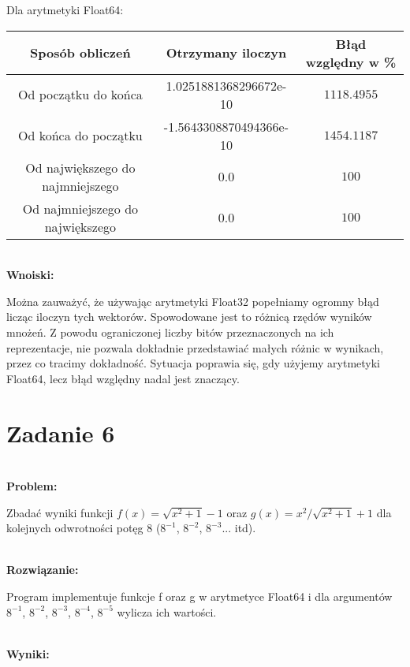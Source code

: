 \documentclass[a4paper,12pt]{article}
\begin{document}
Dla arytmetyki Float64:

\begin{center}
\begin{tabular}{ |c|c|c| }
\hline
Sposób obliczeń & Otrzymany iloczyn & Błąd względny w \% \\
\hline
Od początku do końca & \small{1.0251881368296672e-10} & \small{\(1118.4955\)} \\
Od końca do początku & \small{-1.5643308870494366e-10} & \small{\(1454.1187\)} \\
Od największego do najmniejszego & \small{0.0} & \small{\(100\)} \\
Od najmniejszego do największego & \small{0.0} & \small{\(100\)} \\
\hline
\end{tabular}
\end{center}

\textbf{\\Wnoiski:}

Można zauważyć, że używając arytmetyki Float32 popełniamy ogromny błąd licząc iloczyn tych wektorów. Spowodowane jest to różnicą rzędów wyników mnożeń. Z powodu ograniczonej liczby bitów przeznaczonych na ich reprezentacje, nie pozwala dokładnie przedstawiać małych różnic w wynikach, przez co tracimy dokładność. Sytuacja poprawia się, gdy użyjemy arytmetyki Float64, lecz błąd względny nadal jest znaczący.

\section{Zadanie 6}

\textbf{\\Problem:}

Zbadać wyniki funkcji \(f(x)=\sqrt{x^2+1}-1\) oraz \(g(x)=x^2/\sqrt{x^2+1}+1\) dla kolejnych odwrotności potęg 8 (\(8^{-1}\), \(8^{-2}\), \(8^{-3}\)... itd).

\textbf{\\Rozwiązanie:}

Program implementuje funkcje f oraz g w arytmetyce Float64 i dla argumentów \(8^{-1}\), \(8^{-2}\), \(8^{-3}\), \(8^{-4}\), \(8^{-5}\) wylicza ich wartości.

\textbf{\\Wyniki:}
\end{document}

